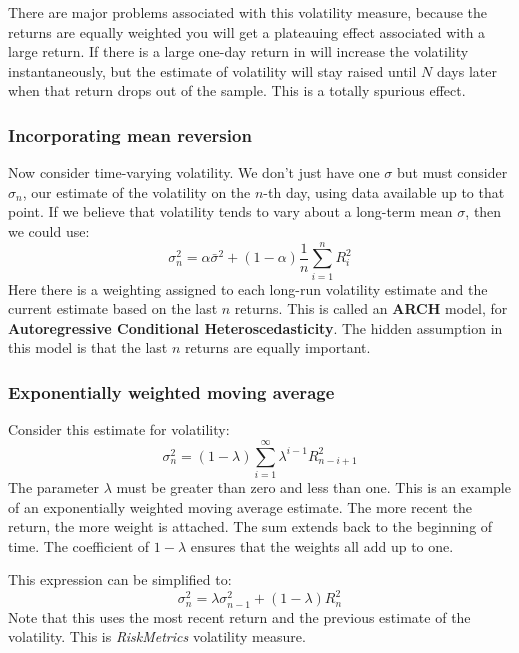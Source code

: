There are major problems associated with this volatility measure, because the returns are equally weighted you will get a plateauing effect associated with a large return. If there is a large one-day return in will increase the volatility instantaneously, but the estimate of volatility will stay raised until $N$ days later when that return drops out of the sample. This is a totally spurious effect.


\subsubsection{Incorporating mean reversion}
Now consider time-varying volatility. We don't just have one $\sigma$ but must consider $\sigma_n$, our estimate of the volatility on the $n$-th day, using data available up to that point. If we believe that volatility tends to vary about a long-term mean $\sigma$, then we could use:
\begin{equation}
	\sigma_n^2 = \alpha \bar{\sigma}^2 + (1 - \alpha) \frac{1}{n} \sum_{i=1}^n R_i^2
\end{equation}
Here there is a weighting assigned to each long-run volatility estimate and the current estimate based on the last $n$ returns. This is called an \textbf{ARCH} model, for \textbf{Autoregressive Conditional Heteroscedasticity}. The hidden assumption in this model is that the last $n$ returns are equally important.


\subsubsection{Exponentially weighted moving average}
Consider this estimate for volatility:
\begin{equation}
	\sigma_n^2 = (1 - \lambda) \sum_{i=1}^\infty\lambda^{i-1} R_{n-i+1}^2
\end{equation}
The parameter $\lambda$ must be greater than zero and less than one. This is an example of an exponentially weighted moving average estimate. The more recent the return, the more weight is attached. The sum extends back to the beginning of time. The coefficient of $1 - \lambda$ ensures that the weights all add up to one.

This expression can be simplified to:
\begin{equation}
	\sigma_n^2 = \lambda \sigma_{n-1}^2 + (1 - \lambda) R_n^2
\end{equation}
Note that this uses the most recent return and the previous estimate of the volatility. This is \textit{RiskMetrics} volatility measure.

